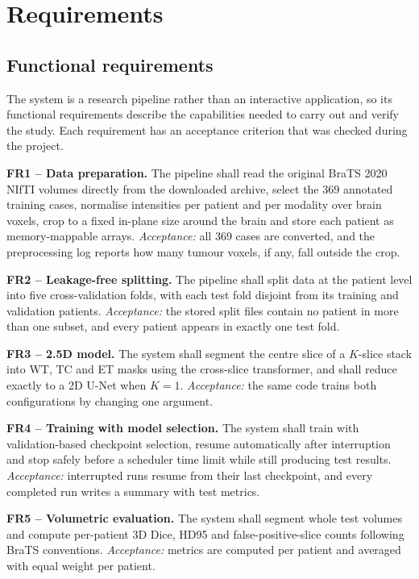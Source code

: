 \clearpage
\chapter{Requirements}
\section{Functional requirements}
The system is a research pipeline rather than an interactive application, so its functional requirements describe the capabilities needed to carry out and verify the study. Each requirement has an acceptance criterion that was checked during the project.

\textbf{FR1 -- Data preparation.} The pipeline shall read the original BraTS 2020 NIfTI volumes directly from the downloaded archive, select the 369 annotated training cases, normalise intensities per patient and per modality over brain voxels, crop to a fixed in-plane size around the brain and store each patient as memory-mappable arrays. \emph{Acceptance:} all 369 cases are converted, and the preprocessing log reports how many tumour voxels, if any, fall outside the crop.

\textbf{FR2 -- Leakage-free splitting.} The pipeline shall split data at the patient level into five cross-validation folds, with each test fold disjoint from its training and validation patients. \emph{Acceptance:} the stored split files contain no patient in more than one subset, and every patient appears in exactly one test fold.

\textbf{FR3 -- 2.5D model.} The system shall segment the centre slice of a $K$-slice stack into WT, TC and ET masks using the cross-slice transformer, and shall reduce exactly to a 2D U-Net when $K=1$. \emph{Acceptance:} the same code trains both configurations by changing one argument.

\textbf{FR4 -- Training with model selection.} The system shall train with validation-based checkpoint selection, resume automatically after interruption and stop safely before a scheduler time limit while still producing test results. \emph{Acceptance:} interrupted runs resume from their last checkpoint, and every completed run writes a summary with test metrics.

\textbf{FR5 -- Volumetric evaluation.} The system shall segment whole test volumes and compute per-patient 3D Dice, HD95 and false-positive-slice counts following BraTS conventions. \emph{Acceptance:} metrics are computed per patient and averaged with equal weight per patient.

